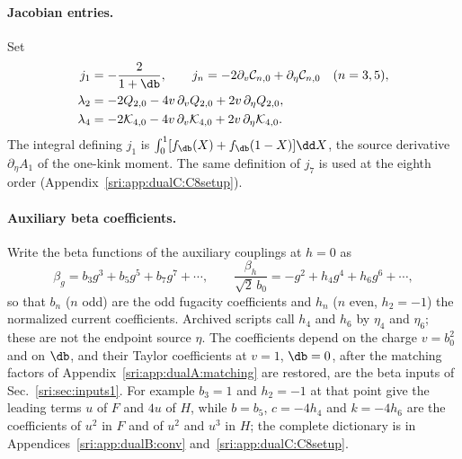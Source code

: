 \paragraph{Jacobian entries.} Set
\begin{equation}
\begin{aligned}
 j_1&=-\frac{2}{1+\db},\qquad j_n=-2\partial_v\mathcal C_{n,0}+\partial_\eta\mathcal C_{n,0}\quad(n=3,5),\\
 \lambda_2&=-2Q_{2,0}-4v\,\partial_vQ_{2,0}+2v\,\partial_\eta Q_{2,0},\\
 \lambda_4&=-2\mathcal K_{4,0}-4v\,\partial_v\mathcal K_{4,0}+2v\,\partial_\eta\mathcal K_{4,0}.
\end{aligned}
\label{sri:eq:dualA:jacobian}
\end{equation}
The integral defining $j_1$ is $\int_0^1[f_{\db}(X)+f_{\db}(1-X)]\dd X$, the source derivative $\partial_\eta A_1$ of
the one-kink moment. The same definition of $j_7$ is used at the eighth order (Appendix~\ref{sri:app:dualC:C8setup}).

\paragraph{Auxiliary beta coefficients.} Write the beta functions of the auxiliary couplings at $h=0$ as
\begin{equation}
 \beta_g=b_3g^3+b_5g^5+b_7g^7+\cdots,\qquad
 \frac{\beta_h}{\sqrt2\,b_0}=-g^2+h_4g^4+h_6g^6+\cdots,
 \label{sri:eq:dualA:auxbeta}
\end{equation}
so that $b_n$ ($n$ odd) are the odd fugacity coefficients and $h_n$ ($n$ even, $h_2=-1$) the normalized current
coefficients. Archived scripts call $h_4$ and $h_6$ by $\eta_4$ and $\eta_6$; these are not the endpoint source $\eta$.
The coefficients depend on the charge $v=b_0^2$ and on $\db$, and their Taylor coefficients at $v=1$, $\db=0$, after
the matching factors of Appendix~\ref{sri:app:dualA:matching} are restored, are the beta inputs of
Sec.~\ref{sri:sec:inputs1}. For example $b_3=1$ and $h_2=-1$ at that point give the leading terms $u$ of $F$ and $4u$ of
$H$, while $b=b_5$, $c=-4h_4$ and $k=-4h_6$ are the coefficients of $u^2$ in $F$ and of $u^2$ and $u^3$ in $H$; the complete dictionary is in Appendices~\ref{sri:app:dualB:conv} and~\ref{sri:app:dualC:C8setup}.

